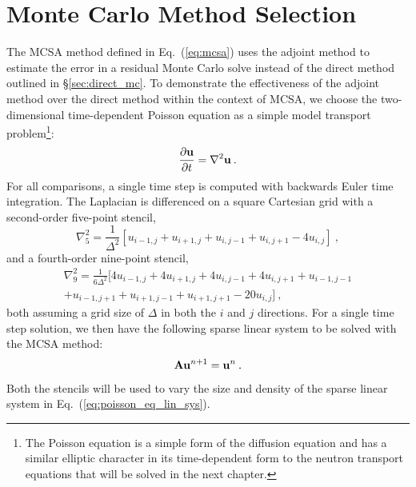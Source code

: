 \section{Monte Carlo Method Selection}
\label{sec:mc_method_selection}
The MCSA method defined in Eq.~(\ref{eq:mcsa}) uses the adjoint method
to estimate the error in a residual Monte Carlo solve instead of the
direct method outlined in \S\ref{sec:direct_mc}. To demonstrate the
effectiveness of the adjoint method over the direct method within the
context of MCSA, we choose the two-dimensional time-dependent Poisson
equation as a simple model transport problem\footnote{The Poisson
  equation is a simple form of the diffusion equation and has a
  similar elliptic character in its time-dependent form to the neutron
  transport equations that will be solved in the next chapter.}:
\begin{equation}
  \frac{\partial \mathbf{u}}{\partial t} = \nabla^2 \mathbf{u}\:.
  \label{eq:poisson_equation}
\end{equation}
For all comparisons, a single time step is computed with backwards Euler time
integration. The Laplacian is differenced on a square Cartesian grid with a
second-order five-point stencil,
\begin{equation}
  \nabla^2_5 = \frac{1}{\Delta^2}[u_{i-1,j} + u_{i+1,j} + u_{i,j-1} +
    u_{i,j+1} - 4 u_{i,j}]\:,
  \label{eq:five_point_stencil}
\end{equation}
and a fourth-order nine-point stencil,
\begin{multline}
  \nabla^2_9 = \frac{1}{6\Delta^2}[4 u_{i-1,j} + 4 u_{i+1,j} + 4
    u_{i,j-1} + 4 u_{i,j+1} + u_{i-1,j-1}\\ + u_{i-1,j+1} +
    u_{i+1,j-1} + u_{i+1,j+1} - 20 u_{i,j}]\:,
  \label{eq:nine_point_stencil}
\end{multline}
both assuming a grid size of $\Delta$ in both the $i$ and $j$ directions. For
a single time step solution, we then have the following sparse linear system
to be solved with the MCSA method:
\begin{equation}
  \mathbf{A} \mathbf{u}^{n+1} = \mathbf{u}^n\:.
  \label{eq:poisson_eq_lin_sys}
\end{equation}
Both the stencils will be used to vary the size and density of the sparse
linear system in Eq.~(\ref{eq:poisson_eq_lin_sys}).


